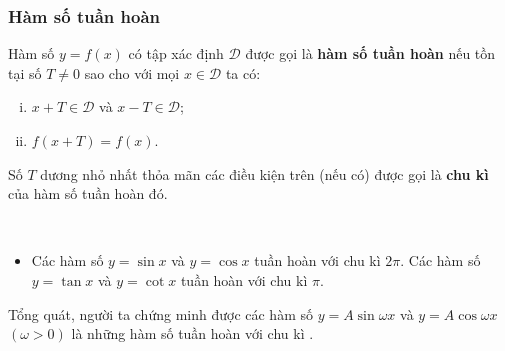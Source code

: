 \begin{tomtat}
	\subsubsection{Hàm số tuần hoàn}
	\begin{dn}
		Hàm số $y=f(x)$ có tập xác định $\mathscr{D}$ được gọi là \textbf{hàm số tuần hoàn} nếu tồn tại số $T \neq 0$ sao cho với mọi $x \in \mathscr{D}$ ta có:
		\begin{enumerate}[i)]
			\item $x+T \in \mathscr{D}$ và $x-T \in \mathscr{D}$;
			\item $f(x+T)=f(x)$.
		\end{enumerate}
		Số $T$ dương nhỏ nhất thỏa mãn các điều kiện trên (nếu có) được gọi là \textbf{chu kì} của hàm số tuần hoàn đó.
	\end{dn}
	\begin{nx}
		\
		\begin{itemize}
			\item  Các hàm số $y=\sin x$ và $y=\cos x$ tuần hoàn với chu kì $2 \pi$. Các hàm số $y=\tan x$ và $y=\cot x$ tuần hoàn với chu kì $\pi$.
		\end{itemize}
	\end{nx}
	\begin{note} 
		Tổng quát, người ta chứng minh được các hàm số $y=A \sin \omega x$ và $y=A \cos \omega x$ $(\omega>0)$ là những hàm số tuần hoàn với chu kì .
	\end{note}

\end{tomtat}
